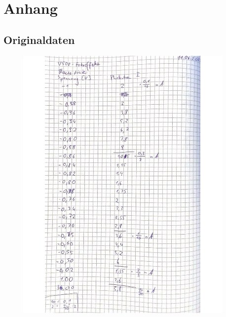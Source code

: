 \section{Anhang}
\label{sec:Anhang}
\subsection{Originaldaten}
%
\begin{figure}[H]
  \centering
  \includegraphics[width=0.95\textwidth]{content/Bilder/IMG_3213.jpeg}
  \label{fig:Messungen_1}
\end{figure}
